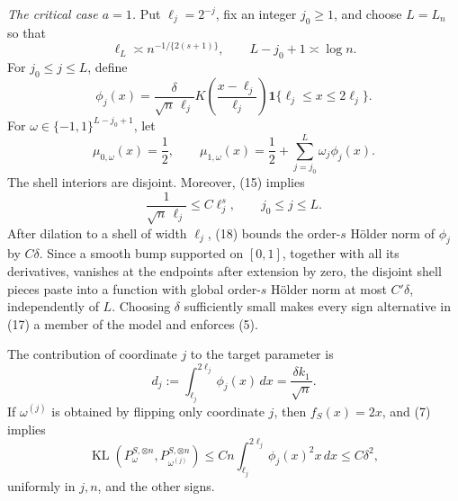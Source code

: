\emph{The critical case \(a=1\).}
Put \(\ell_j=2^{-j}\), fix an integer \(j_0\ge1\), and choose \(L=L_n\) so that
\[
 \ell_L\asymp n^{-1/\{2(s+1)\}},
 \qquad
 L-j_0+1\asymp\log n.
\tag{15}
\]
For \(j_0\le j\le L\), define
\[
 \phi_j(x)=\frac{\delta}{\sqrt n\,\ell_j}
 K\!\left(\frac{x-\ell_j}{\ell_j}\right)
 \mathbf 1\{\ell_j\le x\le2\ell_j\}.
\tag{16}
\]
For \(\omega\in\{-1,1\}^{L-j_0+1}\), let
\[
 \mu_{0,\omega}(x)=\frac12,
 \qquad
 \mu_{1,\omega}(x)=\frac12+
 \sum_{j=j_0}^L\omega_j\phi_j(x).
\tag{17}
\]
The shell interiors are disjoint. Moreover, (15) implies
\[
 \frac1{\sqrt n\,\ell_j}
 \le C\ell_j^s,
 \qquad j_0\le j\le L.
\tag{18}
\]
After dilation to a shell of width \(\ell_j\), (18) bounds the order-\(s\) H\"older norm of \(\phi_j\) by \(C\delta\). Since a smooth bump supported on \([0,1]\), together with all its derivatives, vanishes at the endpoints after extension by zero, the disjoint shell pieces paste into a function with global order-\(s\) H\"older norm at most \(C'\delta\), independently of \(L\). Choosing \(\delta\) sufficiently small makes every sign alternative in (17) a member of the model and enforces (5).

The contribution of coordinate \(j\) to the target parameter is
\[
 d_j:=\int_{\ell_j}^{2\ell_j}\phi_j(x)\,dx
 =\frac{\delta k_1}{\sqrt n}.
\tag{19}
\]
If \(\omega^{(j)}\) is obtained by flipping only coordinate \(j\), then \(f_S(x)=2x\), and (7) implies
\[
 \operatorname{KL}(P_\omega^{S,\otimes n},
                    P_{\omega^{(j)}}^{S,\otimes n})
 \le Cn\int_{\ell_j}^{2\ell_j}\phi_j(x)^2x\,dx
 \le C\delta^2,
\tag{20}
\]
uniformly in \(j,n\), and the other signs.

